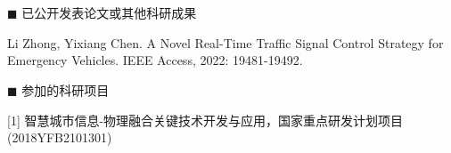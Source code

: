 \newpage
\section*{}
\vskip 5mm

{\heiti $\blacksquare$ 已公开发表论文或其他科研成果}\vskip 5mm
\begin{flushleft}
[1] Li Zhong, Yixiang Chen. A Novel Real-Time Traffic Signal Control Strategy for Emergency Vehicles. IEEE Access, 2022: 19481-19492. 

\end{flushleft}

{\heiti $\blacksquare$ 参加的科研项目}\vskip 5mm
\begin{flushleft}
	
[1] 智慧城市信息$\!$-物理融合关键技术开发与应用，国家重点研发计划项目(2018YFB2101301)

	
\end{flushleft}
 